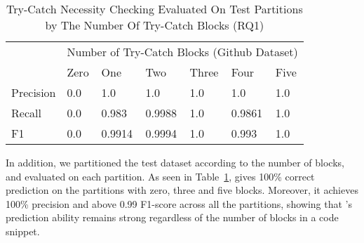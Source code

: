 

\begin{table}[t]%
  \caption{Try-Catch Necessity Checking Evaluated On Test Partitions by The Number Of Try-Catch Blocks (RQ1) }
  \vspace{-12pt}
  \small
	\begin{center}
		\renewcommand{\arraystretch}{1}
		\begin{tabular}{| p{1.0cm}<{\centering} | p{0.7cm}<{\centering} | p{0.7cm}<{\centering}| p{0.7cm}<{\centering} | p{0.7cm}<{\centering} | p{0.7cm}<{\centering} | p{0.7cm}<{\centering} | }
		  \hline
			\multirow{2}{*}{} & \multicolumn{6}{c|}{Number of Try-Catch Blocks (Github Dataset)} \\
			\cline{2-7}
			  & Zero  & One & Two & Three & Four & Five\\
			\hline
			Precision & 0.0 &  1.0 & 1.0 & 1.0 & 1.0 & 1.0\\
			\hline
			Recall   & 0.0 &  0.983 & 0.9988 & 1.0 & 0.9861 & 1.0\\
			\hline
			F1   & 0.0  &  0.9914 & 0.9994 & 1.0 & 0.993 & 1.0\\
			\hline
		\end{tabular}
		\label{tab:rq1-detailed-result}
	\end{center}
\end{table}

In addition, we partitioned the test dataset according to the number
of  blocks, and evaluated {\xblock} on each
partition. As seen in Table~\ref{tab:rq1-detailed-result}, {\xblock}
gives 100\% correct prediction on the partitions with zero, three and
five  blocks. Moreover, it achieves 100\% precision
and above 0.99 F1-score across all the partitions, showing that
{\xblock}'s prediction ability remains strong regardless of the number
of  blocks in a code snippet.



